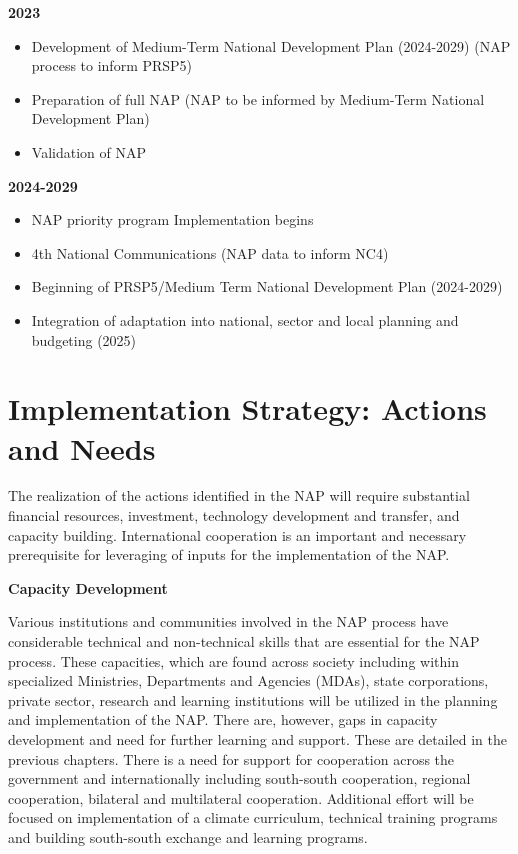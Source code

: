 \documentclass[
]{book}
\providecommand{\tightlist}{%
  \setlength{\itemsep}{0pt}\setlength{\parskip}{0pt}}
\begin{document}
\textbf{2023}

\begin{itemize}
\tightlist
\item
  Development of Medium-Term National Development Plan (2024-2029) (NAP process to inform PRSP5)
\item
  Preparation of full NAP (NAP to be informed by Medium-Term National Development Plan)
\item
  Validation of NAP
\end{itemize}

\textbf{2024-2029}

\begin{itemize}
\tightlist
\item
  NAP priority program Implementation begins
\item
  4th National Communications (NAP data to inform NC4)
\item
  Beginning of PRSP5/Medium Term National Development Plan (2024-2029)
\item
  Integration of adaptation into national, sector and local planning and budgeting (2025)
\end{itemize}

\hypertarget{implementation-strategy-actions-and-needs}{%
\section{Implementation Strategy: Actions and Needs}\label{implementation-strategy-actions-and-needs}}

The realization of the actions identified in the NAP will require substantial financial resources, investment, technology development and transfer, and capacity building. International cooperation is an important and necessary prerequisite for leveraging of inputs for the implementation of the NAP.

\textbf{Capacity Development}

Various institutions and communities involved in the NAP process have considerable technical and non-technical skills that are essential for the NAP process. These capacities, which are found across society including within specialized Ministries, Departments and Agencies (MDAs), state corporations, private sector, research and learning institutions will be utilized in the planning and implementation of the NAP. There are, however, gaps in capacity development and need for further learning and support. These are detailed in the previous chapters. There is a need for support for cooperation across the government and internationally including south-south cooperation, regional cooperation, bilateral and multilateral cooperation. Additional effort will be focused on implementation of a climate curriculum, technical training programs and building south-south exchange and learning programs.
\end{document}
